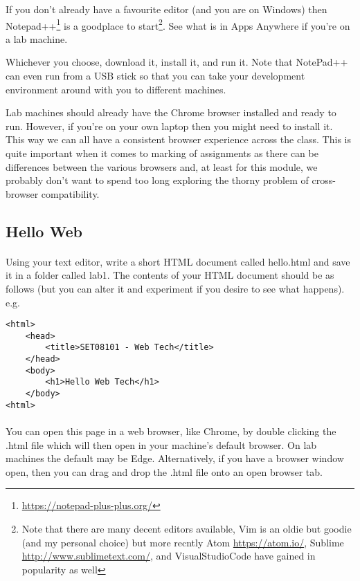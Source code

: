 \documentclass[10pt, a4paper]{article}
\begin{document}
If you don't already have a favourite editor (and you are on Windows) then Notepad++\footnote{\url{https://notepad-plus-plus.org/}} is a goodplace to start\footnote{Note that there are many decent editors available, Vim is an oldie but goodie (and my personal choice) but more recntly Atom \url{https://atom.io/}, Sublime \url{http://www.sublimetext.com/}, and VisualStudioCode \url{} have gained in popularity as well}. See what is in Apps Anywhere if you're on a lab machine.

Whichever you choose, download it, install it, and run it. Note that NotePad++ can even run from a USB stick so that you can take your development environment around with you to different machines.

Lab machines should already have the Chrome browser installed and ready to run. However, if you're on your own laptop then you might need to install it. This way we can all have a consistent browser experience across the class. This is quite important when it comes to marking of assignments as there can be differences between the various browsers and, at least for this module, we probably don't want to spend too long exploring the thorny problem of cross-browser compatibility.

\subsection{Hello Web}

\paragraph{} Using your text editor, write a short HTML document called hello.html and save it in a folder called lab1. The contents of your HTML document should be as follows (but you can alter it and experiment if you desire to see what happens). e.g.

\begin{lstlisting}
<html>
    <head>
        <title>SET08101 - Web Tech</title>
    </head>
    <body>
        <h1>Hello Web Tech</h1>
    </body>
<html>
\end{lstlisting}

\paragraph{} You can open this page in a web browser, like Chrome, by double clicking the .html file which will then open in your machine's default browser. On lab machines the default may be Edge. Alternatively, if you have a browser window open, then you can drag and drop the .html file onto an open browser tab.
\end{document}
